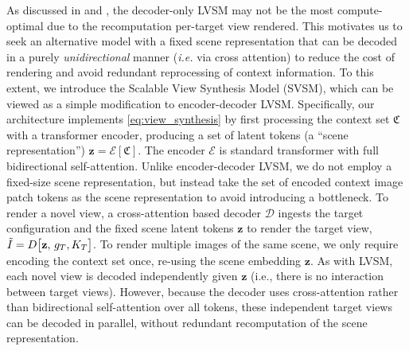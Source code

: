 As discussed in  and , the decoder-only LVSM may not be the most compute-optimal due to the recomputation per-target view rendered. 
This motivates us to seek an alternative model with a fixed scene representation that can be decoded in a purely \emph{unidirectional} manner (\emph{i.e.} via cross attention) to reduce the cost of rendering and avoid redundant reprocessing of context information. To this extent, we introduce the Scalable View Synthesis Model (SVSM), which can be viewed as a simple modification to encoder-decoder LVSM.
%
Specifically, our architecture implements \eqref{eq:view_synthesis} by first processing the context set $\mathfrak{C}$ with a transformer encoder, producing a set of latent tokens (a ``scene representation'') $\mathbf{z} = \mathcal E[\mathfrak{C}]$.
The encoder $\mathcal E$ is standard transformer with full bidirectional self-attention.
Unlike encoder-decoder LVSM, we do not employ a fixed-size scene representation, but instead take the set of encoded context image patch tokens as the scene representation to avoid introducing a bottleneck. To render a novel view, a cross-attention based decoder $\mathcal D$ ingests the target configuration and the fixed scene latent tokens $\mathbf{z}$ to render the target view, $\tilde{I} = D \big[\mathbf{z}, \, g_{T}, K_{T} \big]$. 
%
To render multiple images of the same scene, we only require encoding the context set once, re-using the scene embedding $\mathbf{z}$. As with LVSM, each novel view is decoded independently given $\mathbf{z}$ (i.e., there is no interaction between target views). However, because the decoder uses cross-attention rather than bidirectional self-attention over all tokens, these independent target views can be decoded in parallel, without redundant recomputation of the scene representation.

